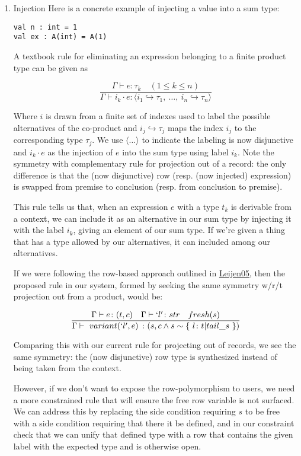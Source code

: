 \documentclass[11pt]{article}
\begin{document}
\begin{enumerate}
\item Injection
\label{sec:orgc9f05fe}
Here is a concrete example of injecting a value into a sum type:

\begin{verbatim}
val n : int = 1
val ex : A(int) = A(1)
\end{verbatim}

A textbook rule for eliminating an expression belonging to a finite
product type can be given as

$$
\frac
{ \Gamma \vdash e \colon \tau_k  \quad (1 \le k \le n)}
{ \Gamma \vdash i_k \cdot e \colon \langle i_1 \hookrightarrow \tau_1, \ \ldots, \ i_n \hookrightarrow \tau_n \rangle }
$$

Where \(i\) is drawn from a finite set of indexes used to label the
possible alternatives of the co-product and
\(i_j \hookrightarrow \tau_j\) maps the index \(i_j\) to the
corresponding type \(\tau_j\). We use \(\langle \ldots \rangle\) to
indicate the labeling is now disjunctive and \(i_k \cdot e\) as the
injection of \(e\) into the sum type using label \(i_k\). Note the
symmetry with complementary rule for projection out of a record: the
only difference is that the (now disjunctive) row (resp. (now injected)
expression) is swapped from premise to conclusion (resp. from conclusion
to premise).

This rule tells us that, when an expression \(e\) with a type \(t_k\) is
derivable from a context, we can include it as an alternative in our sum
type by injecting it with the label \(i_k\), giving an element of our
sum type. If we're given a thing that has a type allowed by our
alternatives, it can included among our alternatives.

If we were following the row-based approach outlined in
\href{https://www.microsoft.com/en-us/research/publication/extensible-records-with-scoped-labels/}{Leijen05},
then the proposed rule in our system, formed by seeking the same
symmetry w/r/t projection out from a product, would be:

$$
\frac
{ \Gamma \vdash e \colon (t, c) \quad \Gamma \vdash `l' \colon str \quad fresh(s) }
{ \Gamma \vdash \ variant(`l', e) \ \colon (s, c \land s \sim \{ \ l \colon t | tail\_s \ \}) }
$$

Comparing this with our current rule for projecting out of records, we
see the same symmetry: the (now disjunctive) row type is synthesized
instead of being taken from the context.

However, if we don't want to expose the row-polymorphism to users, we need a
more constrained rule that will ensure the free row variable is not surfaced. We
can address this by replacing the side condition requiring \(s\) to be free with a side
condition requiring that there it be defined, and in our constraint check that
we can unify that defined type with a row that contains the given label with the
expected type and is otherwise open.


\end{enumerate}
\end{document}
